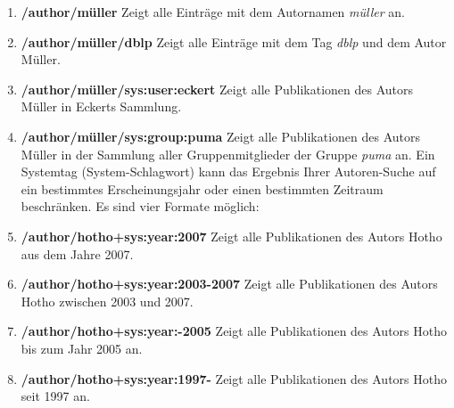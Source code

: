 \documentclass[a4paper,11pt,twoside]{scrbook}
\begin{document}
\begin{enumerate}
    \item \textbf{/author/müller} \newline
    Zeigt alle Einträge mit dem Autornamen \textit{müller} an.
    \item \textbf{/author/müller/dblp} \newline
    Zeigt alle Einträge mit dem Tag \textit{dblp} und dem Autor Müller.
    \item \textbf{/author/müller/sys:user:eckert}\newline
    Zeigt alle Publikationen des Autors Müller in Eckerts Sammlung.
    \item \textbf{/author/müller/sys:group:puma} \newline
    Zeigt alle Publikationen des Autors Müller in der Sammlung aller Gruppenmitglieder der Gruppe \textit{puma} an. 
\newline
\newline
Ein Systemtag (System-Schlagwort) kann das Ergebnis Ihrer Autoren-Suche auf ein bestimmtes Erscheinungsjahr oder einen bestimmten Zeitraum beschränken. Es sind vier Formate möglich:%
    \item \textbf{/author/hotho+sys:year:2007} \newline
    Zeigt alle Publikationen des Autors Hotho aus dem Jahre 2007.
    \item \textbf{/author/hotho+sys:year:2003-2007} \newline
    Zeigt alle Publikationen des Autors Hotho zwischen 2003 und 2007.
    \item \textbf{/author/hotho+sys:year:-2005} \newline
    Zeigt alle Publikationen des Autors Hotho bis zum Jahr 2005 an.
    \item \textbf{/author/hotho+sys:year:1997-} \newline
    Zeigt alle Publikationen des Autors Hotho seit 1997 an.
\end{enumerate}
\end{document}
